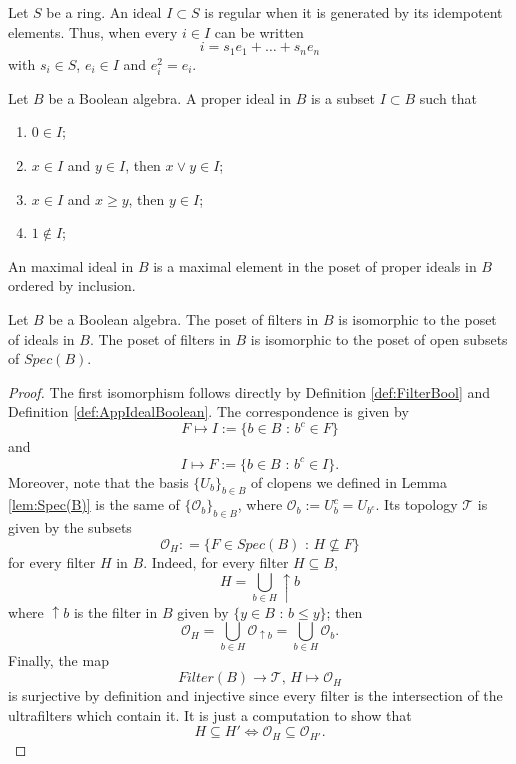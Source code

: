 \begin{definition}
    Let $S$ be a ring. An ideal $I\subset S$ is regular when it is generated by its idempotent elements. Thus, when every $i\in I$ can be written
    \[ i = s_1e_1 + \dots + s_n e_n \]
    with $s_i\in S$, $e_i\in I$ and $e_i^2 = e_i$.
\end{definition}

\begin{definition}
\label{def:AppIdealBoolean}
    Let $B$ be a Boolean algebra. A proper ideal in $B$ is a subset $I\subset B$ such that
    \begin{enumerate}
        \item $0\in I$;
        \item $x\in I$ and $y\in I$, then $x\vee y\in I$;
        \item $x\in I$ and $x\geq y$, then $y\in I$;
        \item $1\not\in I$;
    \end{enumerate}
    An maximal ideal in $B$ is a maximal element in the poset of proper ideals in $B$ ordered by inclusion.
\end{definition}

\begin{lemma}
\label{lem:A21}
    Let $B$ be a Boolean algebra. The poset of filters in $B$ is isomorphic to the poset of ideals in $B$. The poset of filters in $B$ is isomorphic to the poset of open subsets of $Spec(B)$.
    \begin{proof}
        The first isomorphism follows directly by Definition \ref{def:FilterBool} and Definition \ref{def:AppIdealBoolean}. The correspondence is given by
        \[ F \longmapsto I:=\{b\in B\text{ : }b^c\in F\} \]
        and
        \[ I\longmapsto F:=\{b\in B\text{ : }b^c\in I\}. \]
        Moreover, note that the basis $\{U_b\}_{b\in B}$ of clopens we defined in Lemma \ref{lem:Spec(B)} is the same of $\{\mathcal{O}_b\}_{b\in B}$, where $\mathcal{O}_b:=U_b^c=U_{b^c}$. Its topology $\mathcal{T}$ is given by the subsets
        \[ \mathcal{O}_H : = \{ F\in Spec(B)\text{ : } H\not\subseteq F \} \]
        for every filter $H$ in $B$. Indeed, for every filter $H\subseteq B$, 
        \[ H = \bigcup_{b\in H}\uparrow b \]
        where $\uparrow b$ is the filter in $B$ given by $\{y\in B\text{ : }b\leq y\}$; then
        \[ \mathcal{O}_H = \bigcup_{b\in H}\mathcal{O}_{\uparrow b}  = \bigcup_{b\in H}\mathcal{O}_{b}. \]
        Finally, the map
        \[ Filter(B)\longrightarrow\mathcal{T}\text{, } H\longmapsto \mathcal{O}_H \]
        is surjective by definition and injective since every filter is the intersection of the ultrafilters which contain it. It is just a computation to show that
        \[ H\subseteq H' \iff \mathcal{O}_H\subseteq \mathcal{O}_{H'}. \]
    \end{proof}
\end{lemma}

